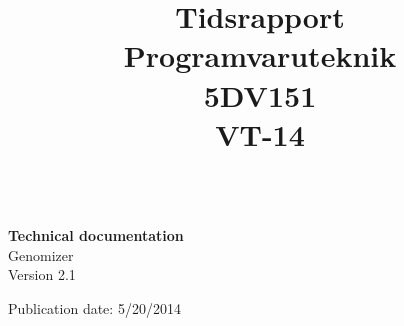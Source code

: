 \title{Tidsrapport \\ 
	Programvaruteknik \\5DV151\\
	VT-14 }
	\begin{titlepage}
		\thispagestyle{empty}
		\begin{large}
			\begin{tabular}{@{}p{\textwidth}@{}}
			\end{tabular}
		\end{large}
		\vspace{35mm}
		\begin{center}
			\Huge{\textbf{Technical documentation}\\ Genomizer} \\
			\vspace{10mm}
			\LARGE{Version 2.1} \\
           \vspace{5mm}
           
            Publication date: 5/20/2014 \\
            

			\vspace{70mm}
            
			\begin{normalsize}				
			\end{normalsize}
		\end{center}
	\end{titlepage}